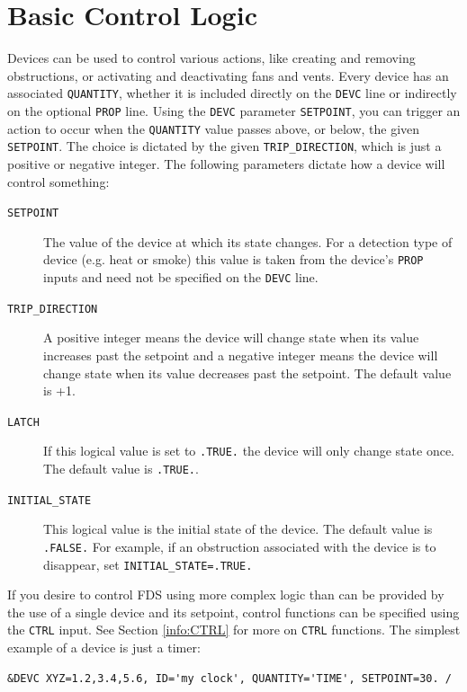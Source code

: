 \documentclass[11pt]{book}
\newcommand{\ct}{\tt\small}
\begin{document}
\clearpage

\section{Basic Control Logic}
\label{info:basic_control}

Devices can be used to control various actions, like creating and removing obstructions, or activating and deactivating
fans and vents. Every device has an associated {\ct QUANTITY}, whether it is included directly on the {\ct DEVC} line or
indirectly on the optional {\ct PROP} line. Using the {\ct DEVC} parameter {\ct SETPOINT}, you can trigger an action to
occur when the {\ct QUANTITY} value passes above, or below, the given {\ct SETPOINT}. The choice is dictated by the
given {\ct TRIP\_DIRECTION}, which is just a positive or negative integer.
The following parameters dictate how a device will control something:
\begin{description}
\item[{\ct SETPOINT}] The value of the device at which its state changes.  For a detection type of device
(e.g. heat or smoke) this value is taken from the device's {\ct PROP} inputs and need not be specified on the {\ct DEVC} line.
\item[{\ct TRIP\_DIRECTION}] A positive integer means the device will change state when its value increases
past the setpoint and a negative integer means the device will change state
when its value decreases past the setpoint.  The default value is +1.
\item[{\ct LATCH}] If this logical value is set to {\ct .TRUE.} the device will only change state once.
The default value is {\ct .TRUE.}.
\item[{\ct INITIAL\_STATE}] This logical value is the initial state of the device. The default value
is {\ct .FALSE.} For example, if an obstruction associated with the device is to disappear, set {\ct INITIAL\_STATE=.TRUE.}
\end{description}
If you desire to control FDS using more complex logic than can be provided
by the use of a single device and its setpoint, control functions can be specified using the {\ct CTRL} input.
See Section \ref{info:CTRL} for more on {\ct CTRL} functions.
The simplest example of a device is just a timer:

\footnotesize
\begin{verbatim}
&DEVC XYZ=1.2,3.4,5.6, ID='my clock', QUANTITY='TIME', SETPOINT=30. /
\end{verbatim}
\normalsize
\end{document}
